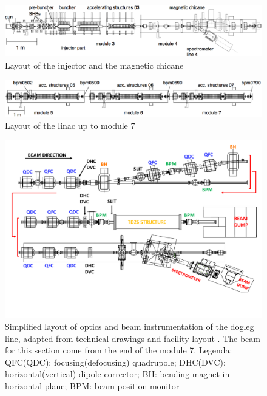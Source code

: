 \begin{landscape}
\begin{center}

\begin{figure}[h]
\centering 
\includegraphics[width=23cm,keepaspectratio]{pictures/Injector}
\caption{Layout of the injector and the magnetic chicane}
\label{injlayout}
\end{figure}

\vspace{20mm}

\begin{figure}[h]
\centering 
\includegraphics[width=23cm,keepaspectratio]{pictures/girder5-7}
\caption{Layout of the linac up to module 7}
\label{injlayout}
\end{figure}

\end{center}
\end{landscape}



\begin{landscape}
\begin{figure}
\centering 
\includegraphics[scale=0.78]{pictures/modified_pets.pdf}
\caption{Simplified layout of optics and beam instrumentation of the dogleg line, adapted from technical drawings and facility layout \cite{EDMS:CTF3}. The beam for this section come from the end of the module 7. Legenda: QFC(QDC): focusing(defocusing) quadrupole; DHC(DVC): horizontal(vertical) dipole corrector; BH: bending magnet in horizontal plane; BPM: beam position monitor}
\label{dolaut}
\end{figure}
\end{landscape}


